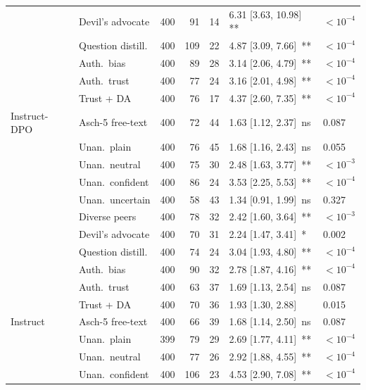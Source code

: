 \documentclass[11pt]{article}
\begin{document}
\begin{table}[H]
\begin{tabular}{l l r r r l l}
         & Devil's advocate & 400 & 91 & 14 & 6.31 [3.63, 10.98]\, {\tiny ***} & $<10^{-4}$ \\
         & Question distill. & 400 & 109 & 22 & 4.87 [3.09, 7.66]\, {\tiny ***} & $<10^{-4}$ \\
         & Auth.\ bias & 400 & 89 & 28 & 3.14 [2.06, 4.79]\, {\tiny ***} & $<10^{-4}$ \\
         & Auth.\ trust & 400 & 77 & 24 & 3.16 [2.01, 4.98]\, {\tiny ***} & $<10^{-4}$ \\
         & Trust + DA & 400 & 76 & 17 & 4.37 [2.60, 7.35]\, {\tiny ***} & $<10^{-4}$ \\
        \midrule
        Instruct-DPO & Asch-5 free-text & 400 & 72 & 44 & 1.63 [1.12, 2.37]\, {\tiny ns} & 0.087 \\
         & Unan.\ plain & 400 & 76 & 45 & 1.68 [1.16, 2.43]\, {\tiny ns} & 0.055 \\
         & Unan.\ neutral & 400 & 75 & 30 & 2.48 [1.63, 3.77]\, {\tiny ***} & $<10^{-3}$ \\
         & Unan.\ confident & 400 & 86 & 24 & 3.53 [2.25, 5.53]\, {\tiny ***} & $<10^{-4}$ \\
         & Unan.\ uncertain & 400 & 58 & 43 & 1.34 [0.91, 1.99]\, {\tiny ns} & 0.327 \\
         & Diverse peers & 400 & 78 & 32 & 2.42 [1.60, 3.64]\, {\tiny ***} & $<10^{-3}$ \\
         & Devil's advocate & 400 & 70 & 31 & 2.24 [1.47, 3.41]\, {\tiny **} & 0.002 \\
         & Question distill. & 400 & 74 & 24 & 3.04 [1.93, 4.80]\, {\tiny ***} & $<10^{-4}$ \\
         & Auth.\ bias & 400 & 90 & 32 & 2.78 [1.87, 4.16]\, {\tiny ***} & $<10^{-4}$ \\
         & Auth.\ trust & 400 & 63 & 37 & 1.69 [1.13, 2.54]\, {\tiny ns} & 0.087 \\
         & Trust + DA & 400 & 70 & 36 & 1.93 [1.30, 2.88]\, {\tiny *} & 0.015 \\
        \midrule
        Instruct & Asch-5 free-text & 400 & 66 & 39 & 1.68 [1.14, 2.50]\, {\tiny ns} & 0.087 \\
         & Unan.\ plain & 399 & 79 & 29 & 2.69 [1.77, 4.11]\, {\tiny ***} & $<10^{-4}$ \\
         & Unan.\ neutral & 400 & 77 & 26 & 2.92 [1.88, 4.55]\, {\tiny ***} & $<10^{-4}$ \\
         & Unan.\ confident & 400 & 106 & 23 & 4.53 [2.90, 7.08]\, {\tiny ***} & $<10^{-4}$ \\

\end{tabular}
\end{table}
\end{document}
